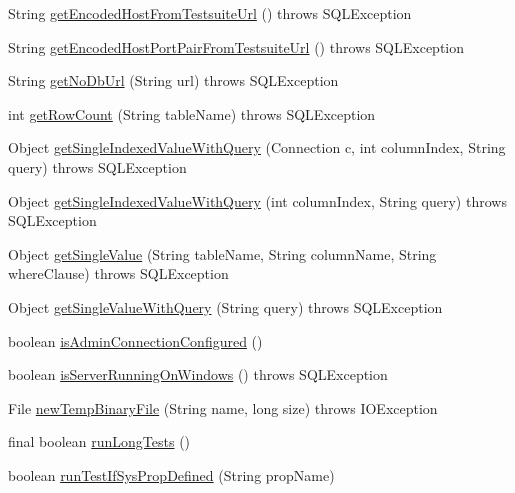 \begin{DoxyCompactItemize}
String \mbox{\hyperlink{classtestsuite_1_1_base_test_case_a7fe9be098761a2a4be2015159cc28c38}{get\+Encoded\+Host\+From\+Testsuite\+Url}} ()  throws S\+Q\+L\+Exception 
\item 
String \mbox{\hyperlink{classtestsuite_1_1_base_test_case_a73146c2e50648aff4fba85d64d2113ec}{get\+Encoded\+Host\+Port\+Pair\+From\+Testsuite\+Url}} ()  throws S\+Q\+L\+Exception 
\item 
String \mbox{\hyperlink{classtestsuite_1_1_base_test_case_a06e75a59b8ce3e4d6a70ac7a50c4dad4}{get\+No\+Db\+Url}} (String url)  throws S\+Q\+L\+Exception 
\item 
int \mbox{\hyperlink{classtestsuite_1_1_base_test_case_a6a6e1d72f46dd17581da3f719a72417a}{get\+Row\+Count}} (String table\+Name)  throws S\+Q\+L\+Exception 
\item 
Object \mbox{\hyperlink{classtestsuite_1_1_base_test_case_a0cafe07cb8206e968a45d675446f2e48}{get\+Single\+Indexed\+Value\+With\+Query}} (Connection c, int column\+Index, String query)  throws S\+Q\+L\+Exception 
\item 
Object \mbox{\hyperlink{classtestsuite_1_1_base_test_case_a863b877857af0632dbdfb73b3cc0dfcc}{get\+Single\+Indexed\+Value\+With\+Query}} (int column\+Index, String query)  throws S\+Q\+L\+Exception 
\item 
Object \mbox{\hyperlink{classtestsuite_1_1_base_test_case_acd63545de5bb38d1a442c2a09d3bddc4}{get\+Single\+Value}} (String table\+Name, String column\+Name, String where\+Clause)  throws S\+Q\+L\+Exception 
\item 
Object \mbox{\hyperlink{classtestsuite_1_1_base_test_case_a64b5c6d2782cd2ac6f359edf9b5c7365}{get\+Single\+Value\+With\+Query}} (String query)  throws S\+Q\+L\+Exception 
\item 
boolean \mbox{\hyperlink{classtestsuite_1_1_base_test_case_a0c430c33af3faad8e9490abda2054142}{is\+Admin\+Connection\+Configured}} ()
\item 
boolean \mbox{\hyperlink{classtestsuite_1_1_base_test_case_a38e227a349a04887dd5fdff34c746389}{is\+Server\+Running\+On\+Windows}} ()  throws S\+Q\+L\+Exception 
\item 
File \mbox{\hyperlink{classtestsuite_1_1_base_test_case_a2fb4c1ccc05d5db9f33abb34e9c2a9a7}{new\+Temp\+Binary\+File}} (String name, long size)  throws I\+O\+Exception 
\item 
final boolean \mbox{\hyperlink{classtestsuite_1_1_base_test_case_ae5d273da4f580cf9778ec0c7c7072fad}{run\+Long\+Tests}} ()
\item 
boolean \mbox{\hyperlink{classtestsuite_1_1_base_test_case_a3578b222700fc502212ce9834194ebaa}{run\+Test\+If\+Sys\+Prop\+Defined}} (String prop\+Name)

\end{DoxyCompactItemize}
